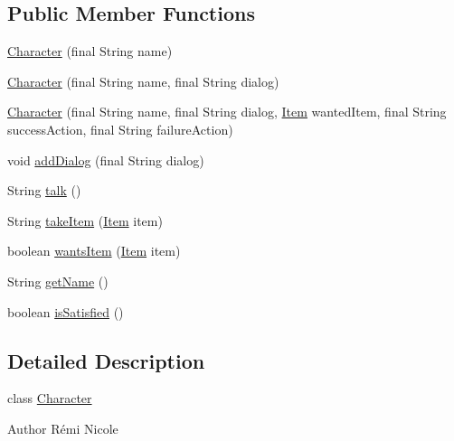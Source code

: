 \subsection*{Public Member Functions}
\begin{DoxyCompactItemize}
\item 
\hyperlink{classpkg__world_1_1pkg__characters_1_1Character_a50bcfb95d983b94d0335bd457d575872}{Character} (final String name)
\item 
\hyperlink{classpkg__world_1_1pkg__characters_1_1Character_a1dcca115f6536e7d4d99ab3880291376}{Character} (final String name, final String dialog)
\item 
\hyperlink{classpkg__world_1_1pkg__characters_1_1Character_a3944beae4c725dac40c288715af8061c}{Character} (final String name, final String dialog, \hyperlink{classpkg__world_1_1pkg__items_1_1Item}{Item} wanted\-Item, final String success\-Action, final String failure\-Action)
\item 
void \hyperlink{classpkg__world_1_1pkg__characters_1_1Character_a926da3833d26f4800fcd62917be5abcc}{add\-Dialog} (final String dialog)
\item 
String \hyperlink{classpkg__world_1_1pkg__characters_1_1Character_a8b6d62bb87460e19dc0e4561beb1ece1}{talk} ()
\item 
String \hyperlink{classpkg__world_1_1pkg__characters_1_1Character_a0fb83fcff9b37c94eac3fb35868bebb2}{take\-Item} (\hyperlink{classpkg__world_1_1pkg__items_1_1Item}{Item} item)
\item 
boolean \hyperlink{classpkg__world_1_1pkg__characters_1_1Character_a816f8f79ef1e8c9635f0cdeb180b9f3f}{wants\-Item} (\hyperlink{classpkg__world_1_1pkg__items_1_1Item}{Item} item)
\item 
String \hyperlink{classpkg__world_1_1pkg__characters_1_1Character_a660097e198e2e62f83d83a8872eb55d1}{get\-Name} ()
\item 
boolean \hyperlink{classpkg__world_1_1pkg__characters_1_1Character_ae18c62b235802dd5bfacf662f0a1d17d}{is\-Satisfied} ()
\end{DoxyCompactItemize}


\subsection{Detailed Description}
class \hyperlink{classpkg__world_1_1pkg__characters_1_1Character}{Character} \begin{DoxyAuthor}{Author}
Rémi Nicole 
\end{DoxyAuthor}



